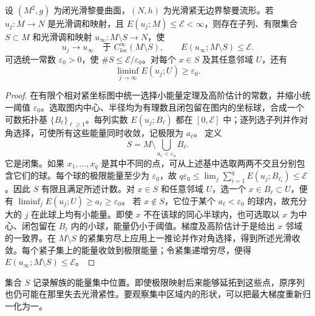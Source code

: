 \begin{theorem}\label{g3:thm:harmonic-map-concentration-compactness}
	设 \((M^2,g)\) 为闭光滑黎曼曲面，\((N,h)\) 为光滑紧无边界黎曼流形。若 \(u_j:M\to N\) 是光滑调和映射，且 \(E(u_j;M)\le\mathcal E<\infty\)，则存在子列、有限集合 \(S\subset M\) 和光滑调和映射 \(u_\infty:M\setminus S\to N\)，使
	\[
		u_j\longrightarrow u_\infty\quad\text{于 }C^\infty_{\mathrm{loc}}(M\setminus S),
		\qquad E(u_\infty;M\setminus S)\le\mathcal E.
	\]
	可选统一常数 \(\varepsilon_0>0\)，使 \(\#S\le\mathcal E/\varepsilon_0\)。对每个 \(x\in S\) 及其任意邻域 \(U\)，还有
	\[
		\liminf_{j\to\infty}E(u_j;U)\ge\varepsilon_0.
	\]
\end{theorem}
\begin{proof}
	在有限个相对紧坐标图中统一选择小能量定理及高阶估计的常数，并缩小统一阈值 \(\varepsilon_0\)。选取图内中心、半径均为有理数且闭包留在图内的坐标球，合成一个可数拓扑基 \(\{B_\ell\}_{\ell\ge1}\)。每列实数 \(E(u_j;B_\ell)\) 都在 \([0,\mathcal E]\) 中；逐列选子列并作对角选择，可使所有这些能量同时收敛，记极限为 \(a_\ell\)。
	定义
	\[
		S=M\setminus\bigcup_{a_\ell<\varepsilon_0}B_\ell.
	\]
	它是闭集。如果 \(x_1,\ldots,x_q\) 是其中不同的点，可从上述基中选取两两不交且分别包含它们的球。每个球的极限能量至少为 \(\varepsilon_0\)，故
	\(q\varepsilon_0\le\lim_j\sum_{i=1}^qE(u_j;B_{\ell_i})\le\mathcal E\)。因此 \(S\) 有限且满足所述计数。对 \(x\in S\) 和任意邻域 \(U\)，选一个 \(x\in B_\ell\subset U\)，便有 \(\liminf_jE(u_j;U)\ge a_\ell\ge\varepsilon_0\)。
	若 \(x\notin S\)，它位于某个 \(a_\ell<\varepsilon_0\) 的球内，故充分大的 \(j\) 在此球上均有小能量。即使 \(x\) 不在该球的同心半球内，也可选取以 \(x\) 为中心、闭包留在 \(B_\ell\) 内的小球，能量仍小于阈值。梯度及高阶估计于是给出 \(x\) 邻域的一致界。在 \(M\setminus S\) 的紧集穷尽上应用上一推论并作对角选择，得到所述光滑收敛。每个紧子集上的能量收敛到极限能量；令紧集递增穷尽，便得 \(E(u_\infty;M\setminus S)\le\mathcal E\)。
\end{proof}

集合 \(S\) 记录解族的能量集中位置。即使极限映射后来能够延拓到这些点，原序列也仍可能在那里失去光滑紧性。要观察集中区域内的形状，可以把最大梯度重新归一化为一。

